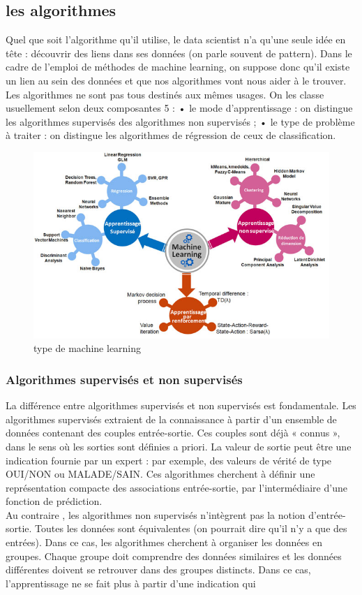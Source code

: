 \documentclass[11pt]{report}
\begin{document}
\subsection{les algorithmes}
Quel que soit l’algorithme qu’il utilise, le data scientist n’a qu’une seule idée en tête :
découvrir des liens dans ses données (on parle souvent de pattern). Dans le cadre de
l’emploi de méthodes de machine learning, on suppose donc qu’il existe un lien au sein
des données et que nos algorithmes vont nous aider à le trouver.\\
Les algorithmes ne sont pas tous destinés aux mêmes usages. On les classe usuellement
selon deux composantes
5
:
• le mode d’apprentissage : on distingue les algorithmes supervisés des algorithmes non
supervisés ;
• le type de problème à traiter : on distingue les algorithmes de régression de ceux de
classification.
\begin{figure}[H]
	\begin{center}
		\includegraphics[width=12cm]{images/machine.jpg}
		\caption{type de machine learning}
		\label{fig:figure}
	\end{center}
\end{figure}
\subsubsection{Algorithmes supervisés et non supervisés}
La différence entre algorithmes supervisés et non supervisés est fondamentale. Les
algorithmes supervisés extraient de la connaissance à partir d’un ensemble de données
contenant des couples entrée-sortie. Ces couples sont déjà « connus », dans le sens où les
sorties sont définies a priori. La valeur de sortie peut être une indication fournie par un
expert : par exemple, des valeurs de vérité de type OUI/NON ou MALADE/SAIN. Ces
algorithmes cherchent à définir une représentation compacte des associations entrée-sortie,
par l’intermédiaire d’une fonction de prédiction.\\
Au contraire , les algorithmes non supervisés n’intègrent pas la notion d’entrée-sortie.
Toutes les données sont équivalentes (on pourrait dire qu’il n’y a que des entrées). Dans ce
cas, les algorithmes cherchent à organiser les données en groupes. Chaque groupe doit
comprendre des données similaires et les données différentes doivent se retrouver dans des
groupes distincts. Dans ce cas, l’apprentissage ne se fait plus à partir d’une indication qui
\end{document}
